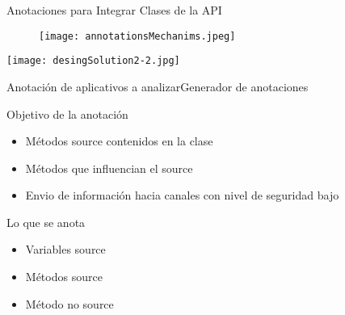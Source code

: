 \begin{frame}{Anotaciones para Integrar Clases de la API}
	\begin{figure}[t!]
		\begin{center} 
		\texttt{[image: annotationsMechanims.jpeg]} 
		\end{center}
	\end{figure}
\end{frame}

\begin{frame}
	\begin{center}
		\texttt{[image: desingSolution2-2.jpg]}
	\end{center}
\end{frame}

\begin{frame}{Anotación de aplicativos a analizar}{Generador de anotaciones}
\begin{block}{Objetivo de la anotación}
	\begin{itemize}
	  \item Métodos source contenidos en la clase
	  \item Métodos que influencian el source
	  \item Envio de información hacia canales con nivel de seguridad bajo
	\end{itemize}
\end{block}	
\pause	
\begin{block}{Lo que se anota}
	\begin{itemize}
	  \item Variables source
	  \item Métodos source
	  \item Método no source
	\end{itemize}
\end{block}		
\end{frame}




